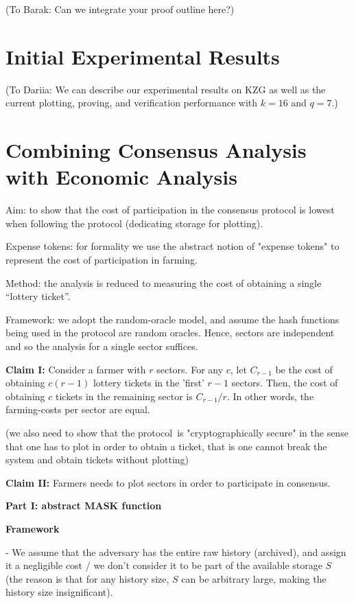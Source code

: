 \documentclass[12pt, onecolumn]{IEEEtran}
\begin{document}
(To Barak: Can we integrate your proof outline here?)

\section{Initial Experimental Results}

(To Dariia: We can describe our experimental results on KZG as well as the current plotting, proving, and verification performance with $k = 16$ and $q = 7$.)


\section{Combining Consensus Analysis with Economic Analysis}

Aim: to show that the cost of participation in the consensus protocol is lowest when following the protocol (dedicating storage for plotting).

Expense tokens: for formality we use the abstract notion of "expense tokens" to represent the cost of participation in farming.

Method: the analysis is reduced to measuring the cost of obtaining a single ``lottery ticket''.

Framework: we adopt the random-oracle model, and assume the hash functions being used in the protocol are random oracles. Hence, sectors are independent and so the analysis for a single sector suffices.

{\bf Claim I:} Consider a farmer with $r$ sectors. For any $c$, let $C_{r-1}$ be the cost of obtaining $c(r-1)$ lottery tickets in the 'first' $r-1$ sectors. Then, the cost of obtaining $c$ tickets in the remaining sector is $C_{r-1}/r$. In other words, the farming-costs per sector are equal.

(we also need to show that the protocol is "cryptographically secure" in the sense that one has to plot in order to obtain a ticket, that is one cannot break the system and obtain tickets without plotting)

{\bf Claim II:} Farmers needs to plot sectors in order to participate in consensus.


\textbf{Part I: abstract MASK function}

\textbf{Framework}

- We assume that the adversary has the entire raw history (archived), and assign it a negligible cost / we don't consider it to be part of the available storage $S$ (the reason is that for any history size, $S$ can be arbitrary large, making the history size insignificant).
\end{document}

